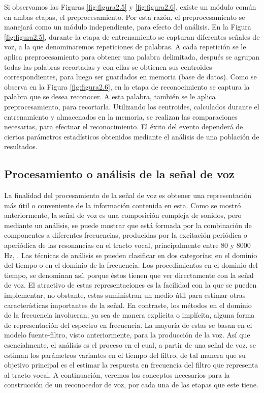 Si observamos las Figuras \ref{fig:figura2.5} y \ref{fig:figura2.6}, existe un módulo común en ambas etapas, el preprocesamiento. Por esta razón, el preprocesamiento se manejará como un módulo independiente, para efecto del análisis.
\vskip 0.5cm
En la Figura \ref{fig:figura2.5}, durante la etapa de entrenamiento se capturan diferentes señales de voz, a la que denominaremos repeticiones de palabras. A cada repetición se le aplica preprocesamiento para obtener una palabra delimitada, después se agrupan todas las palabras recortadas y con ellas se obtienen sus centroides correspondientes, para luego ser guardados en memoria (base de datos).
\vskip 0.5cm
Como se observa en la Figura \ref{fig:figura2.6}, en la etapa de reconocimiento se captura la palabra que se desea reconocer. A esta palabra, también se le aplica preprocesamiento, para recortarla. Utilizando los centroides, calculados durante el entrenamiento y almacenados en la memoria, se realizan las comparaciones necesarias, para efectuar el reconocimiento. El éxito del evento dependerá de ciertos parámetros estadísticos obtenidos mediante el análisis de una población de resultados.

\subsection{Procesamiento o análisis de la señal de voz}
La finalidad del procesamiento de la señal de voz es obtener una representación más útil o conveniente de la información contenida en esta. Como se mostró anteriormente, la señal de voz es una composición compleja de sonidos, pero mediante un análisis, se puede mostrar que está formada por la combinación de componentes a diferentes frecuencias, producidas por la excitación periódica o aperiódica de las resonancias en el tracto vocal, principalmente entre 80 y 8000 Hz, \cite{rowden}.
\vskip 0.5cm
Las técnicas de análisis se pueden clasificar en dos categorías: en el dominio del tiempo o en el dominio de la frecuencia. Los procedimientos en el dominio del tiempo, se denominan así, porque éstos tienen que ver directamente con la señal de voz. El atractivo de estas representaciones es la facilidad con la que se pueden implementar, no obstante, estas suministran un medio útil para estimar otras características importantes de la señal. En contraste, los métodos en el dominio de la frecuencia involucran, ya sea de manera explícita o implícita, alguna forma de representación del espectro en frecuencia. 
\vskip 0.5cm
La mayoría de estas se basan en el modelo fuente-filtro, visto anteriormente, para la producción de la voz. Así que esencialmente, el análisis es el proceso en el cual, a partir de una señal de voz, se estiman los parámetros variantes en el tiempo del filtro, de tal manera que su objetivo principal es el estimar la respuesta en frecuencia del filtro que representa al tracto vocal. 
\vskip 0.5cm
A continuación, veremos los conceptos necesarios para la construcción de un reconocedor de voz, por cada una de las etapas que este tiene.

